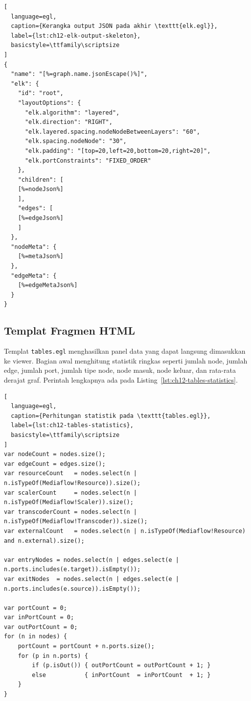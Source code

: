 \begin{lstlisting}[
  language=egl,
  caption={Kerangka output JSON pada akhir \texttt{elk.egl}},
  label={lst:ch12-elk-output-skeleton},
  basicstyle=\ttfamily\scriptsize
]
{
  "name": "[%=graph.name.jsonEscape()%]",
  "elk": {
    "id": "root",
    "layoutOptions": {
      "elk.algorithm": "layered",
      "elk.direction": "RIGHT",
      "elk.layered.spacing.nodeNodeBetweenLayers": "60",
      "elk.spacing.nodeNode": "30",
      "elk.padding": "[top=20,left=20,bottom=20,right=20]",
      "elk.portConstraints": "FIXED_ORDER"
    },
    "children": [
    [%=nodeJson%]
    ],
    "edges": [
    [%=edgeJson%]
    ]
  },
  "nodeMeta": {
    [%=metaJson%]
  },
  "edgeMeta": {
    [%=edgeMetaJson%]
  }
}
\end{lstlisting}

\subsection{Templat Fragmen HTML}

Templat \texttt{tables.egl} menghasilkan panel data yang dapat langsung dimasukkan ke viewer. Bagian awal menghitung statistik ringkas seperti jumlah node, jumlah edge, jumlah port, jumlah tipe node, node masuk, node keluar, dan rata-rata derajat graf. Perintah lengkapnya ada pada Listing~\ref{lst:ch12-tables-statistics}.

\begin{lstlisting}[
  language=egl,
  caption={Perhitungan statistik pada \texttt{tables.egl}},
  label={lst:ch12-tables-statistics},
  basicstyle=\ttfamily\scriptsize
]
var nodeCount = nodes.size();
var edgeCount = edges.size();
var resourceCount   = nodes.select(n | n.isTypeOf(Mediaflow!Resource)).size();
var scalerCount     = nodes.select(n | n.isTypeOf(Mediaflow!Scaler)).size();
var transcoderCount = nodes.select(n | n.isTypeOf(Mediaflow!Transcoder)).size();
var externalCount   = nodes.select(n | n.isTypeOf(Mediaflow!Resource) and n.external).size();

var entryNodes = nodes.select(n | edges.select(e | n.ports.includes(e.target)).isEmpty());
var exitNodes  = nodes.select(n | edges.select(e | n.ports.includes(e.source)).isEmpty());

var portCount = 0;
var inPortCount = 0;
var outPortCount = 0;
for (n in nodes) {
    portCount = portCount + n.ports.size();
    for (p in n.ports) {
        if (p.isOut()) { outPortCount = outPortCount + 1; }
        else           { inPortCount  = inPortCount  + 1; }
    }
}
\end{lstlisting}

